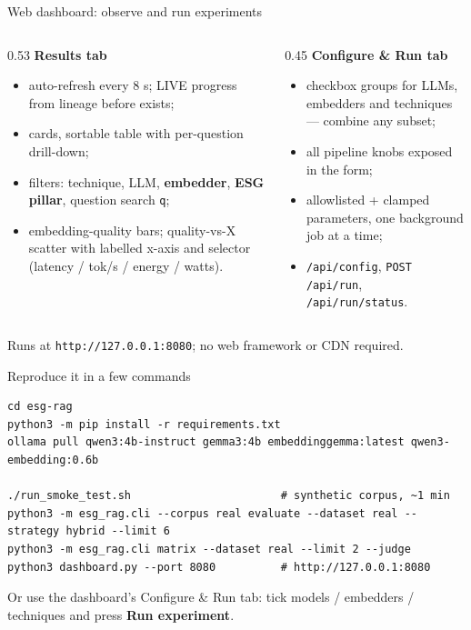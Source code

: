 \documentclass[aspectratio=169]{beamer}
\begin{document}
\begin{frame}{Web dashboard: observe and run experiments}
  \begin{columns}[T]
    \begin{column}{0.53\textwidth}
      \textbf{Results tab}
      \begin{itemize}
        \item auto-refresh every 8 s; LIVE progress from lineage before  exists;
        \item cards, sortable table with per-question drill-down;
        \item filters: technique, LLM, \textbf{embedder}, \textbf{ESG pillar}, question search \texttt{q};
        \item embedding-quality bars; quality-vs-X scatter with labelled x-axis and selector (latency / tok/s / energy / watts).
      \end{itemize}
    \end{column}
    \begin{column}{0.45\textwidth}
      \textbf{Configure \& Run tab}
      \begin{itemize}
        \item checkbox groups for LLMs, embedders and techniques --- combine any subset;
        \item all pipeline knobs exposed in the form;
        \item allowlisted + clamped parameters, one background job at a time;
        \item \texttt{/api/config}, \texttt{POST /api/run}, \texttt{/api/run/status}.
      \end{itemize}
    \end{column}
  \end{columns}
  \vspace{1mm}
  \small Runs at \texttt{http://127.0.0.1:8080}; no web framework or CDN required.
\end{frame}

\begin{frame}[fragile]{Reproduce it in a few commands}
  \begin{lstlisting}
cd esg-rag
python3 -m pip install -r requirements.txt
ollama pull qwen3:4b-instruct gemma3:4b embeddinggemma:latest qwen3-embedding:0.6b

./run_smoke_test.sh                       # synthetic corpus, ~1 min
python3 -m esg_rag.cli --corpus real evaluate --dataset real --strategy hybrid --limit 6
python3 -m esg_rag.cli matrix --dataset real --limit 2 --judge
python3 dashboard.py --port 8080          # http://127.0.0.1:8080
  \end{lstlisting}
  \small Or use the dashboard's Configure \& Run tab: tick models / embedders / techniques and press \textbf{Run experiment}.
\end{frame}
\end{document}
